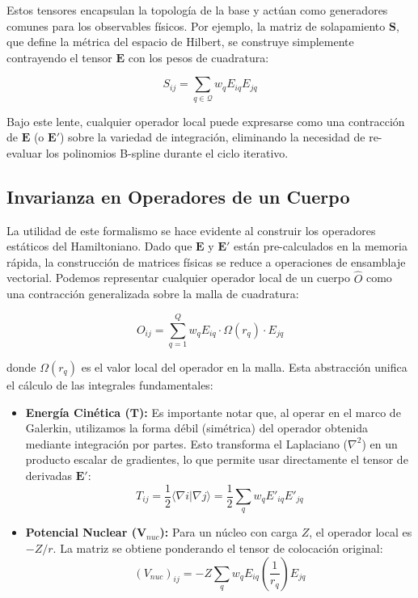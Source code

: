 Estos tensores encapsulan la topología de la base y actúan como generadores comunes para los observables físicos. Por ejemplo, la matriz de solapamiento \( \mathbf{S} \), que define la métrica del espacio de Hilbert, se construye simplemente contrayendo el tensor \( \bm{E} \) con los pesos de cuadratura:

\begin{equation}
S_{ij} = \sum_{q \in \mathcal{Q}} w_q E_{iq} E_{jq}
\end{equation}

Bajo este lente, cualquier operador local puede expresarse como una contracción de \( \bm{E} \) (o \( \bm{E}' \)) sobre la variedad de integración, eliminando la necesidad de re-evaluar los polinomios B-spline durante el ciclo iterativo.

\subsection{Invarianza en Operadores de un Cuerpo}

La utilidad de este formalismo se hace evidente al construir los operadores estáticos del Hamiltoniano. Dado que \( \bm{E} \) y \( \bm{E}' \) están pre-calculados en la memoria rápida, la construcción de matrices físicas se reduce a operaciones de ensamblaje vectorial. Podemos representar cualquier operador local de un cuerpo \( \hat{O} \) como una contracción generalizada sobre la malla de cuadratura:

\begin{equation}
O_{ij} = \sum_{q=1}^Q w_q E_{iq} \cdot \Omega(r_q) \cdot E_{jq}
\end{equation}

donde \( \Omega(r_q) \) es el valor local del operador en la malla. Esta abstracción unifica el cálculo de las integrales fundamentales:

\begin{itemize}
    \item \textbf{Energía Cinética (\( \mathbf{T} \)):}
    Es importante notar que, al operar en el marco de Galerkin, utilizamos la forma débil (simétrica) del operador obtenida mediante integración por partes. Esto transforma el Laplaciano (\( \nabla^2 \)) en un producto escalar de gradientes, lo que permite usar directamente el tensor de derivadas \( \bm{E}' \):
    \begin{equation}
    T_{ij} = \frac{1}{2} \langle \nabla i | \nabla j \rangle = \frac{1}{2} \sum_q w_q E'_{iq} E'_{jq}
    \end{equation}
    
    \item \textbf{Potencial Nuclear (\( \mathbf{V}_{nuc} \)):}
    Para un núcleo con carga \( Z \), el operador local es \( -Z/r \). La matriz se obtiene ponderando el tensor de colocación original:
    \begin{equation}
    (V_{nuc})_{ij} = -Z \sum_q w_q E_{iq} \left( \frac{1}{r_q} \right) E_{jq}
    \end{equation}
\end{itemize}

